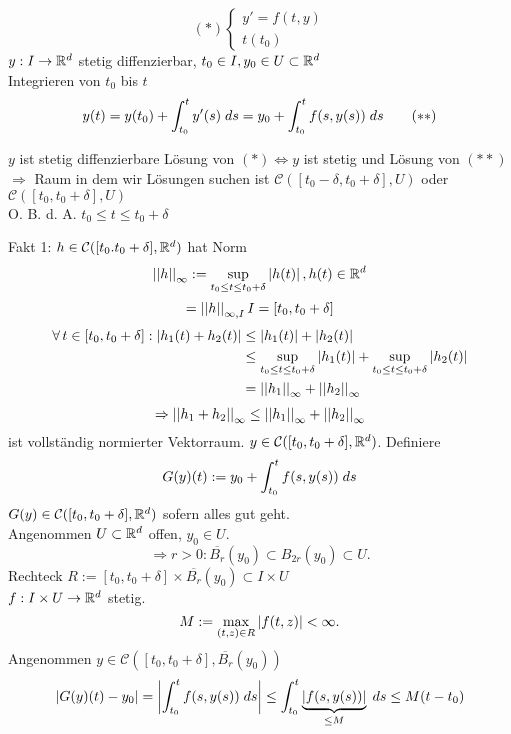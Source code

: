 \documentclass[../ana2.tex]{subfiles}
\begin{document}
\[ (*) \begin{cases}
    y' = f(t,y) \\
    t(t_0)
\end{cases} \]
\( \abb{y}{I}{\R^d} \) stetig diffenzierbar, 
\( t_0 \in I, y_0 \in U \subset \R^d \)\\
Integrieren von \( t_0 \) bis \(t\)
\[ y(t) = y(t_0) + \integralx{y'(s)}{t_0}{t}{s} 
= y_0 + \integralx{f(s, y(s))}{t_0}{t}{s} \tag{\(**\)} \]
\begin{lem}
    \(y\) ist stetig diffenzierbare Lösung von \((*) \Leftrightarrow y\)
    ist stetig und Lösung von \((**)\)\\
    \(\Rightarrow \) Raum in dem wir Lösungen suchen ist 
    \(\mathcal{C}([t_0-\delta, t_0+\delta], U)\)
    oder  \(\mathcal{C}([t_0, t_0+\delta], U)\)\\
    O. B. d. A. \(t_0 \leq t \leq t_0 + \delta\)
\end{lem}
Fakt 1: \( h \in \mathcal{C}([t_0. t_0 + \delta], \R^d) \) 
hat Norm 
\[\norm{h}_\infty := \underset{t_0 \leq t \leq t_0 + \delta}{\sup} \abs{h(t)}, h(t) \in \R^d \]
\[ = \norm{h}_{\infty, I} I = [t_0, t_0 + \delta] \]
\begin{align*}
    \forall t \in [t_0, t_0 + \delta] : \abs{h_1(t) + h_2(t)} &\leq \abs{h_1(t)} + \abs{h_2(t)}\\
    &\leq \underset{t_0 \leq t \leq t_0 + \delta}{\sup} \abs{h_1(t)} 
    + \underset{t_0 \leq t \leq t_0 + \delta}{\sup} \abs{h_2(t)}\\
    &= \norm{h_1}_\infty + \norm{h_2}_\infty
\end{align*}
\[ \Rightarrow \norm{h_1 + h_2}_\infty \leq \norm{h_1}_\infty + \norm{h_2}_\infty \]
ist vollständig normierter Vektorraum.
\( y \in \mathcal{C}([t_0, t_0 + \delta], \R^d) \). Definiere 
\[ G(y)(t) := y_0 + \integralx{f(s, y(s))}{t_0}{t}{s} \]
\( G(y) \in \mathcal{C}([t_0, t_0 + \delta], \R^d) \) sofern alles gut geht.\\
Angenommen \(U \subset \R^d\) offen, \( y_0 \in U \).
\[ \Rightarrow r>0: \overline{B_r}(y_0) \subset B_{2r}(y_0) \subset U. \]
Rechteck \(R := [t_0, t_0+\delta] \times \overline{B_r}(y_0) \subset I \times U\)\\
\(\abb{f}{I\times U}{\R^d}\) stetig. 
\[ M := \underset{(t,z) \in R}{\max} \abs{f(t,z)} < \infty. \]
Angenommen \( y \in \mathcal{C}([t_0, t_0 + \delta], \overline{B_r}(y_0)) \)
\[ \abs{G(y)(t) - y_0} = \abs{\integralx{f(s, y(s))}{t_0}{t}{s}} 
\leq \integralx{\underbrace{\abs{f(s, y(s))}}_{\leq M}}{t_0}{t}{s} \leq M(t - t_0) \]
\end{document}
